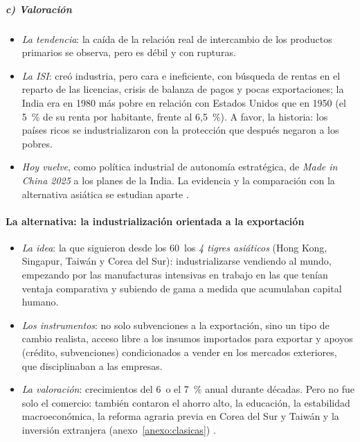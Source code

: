 \documentclass[11pt]{article}
\begin{document}
\subparagraph{c) Valoración}

\begin{itemize}
\item \emph{La tendencia}: la caída de la relación real de intercambio de los productos primarios se observa, pero es débil y con rupturas.
\item \emph{La ISI}: creó industria, pero cara e ineficiente, con búsqueda de rentas en el reparto de las licencias\nocite{Krueger1974Political}, crisis de balanza de pagos y pocas exportaciones; la India era en 1980 más pobre en relación con Estados Unidos que en 1950 (el 5~\% de su renta por habitante, frente al 6,5~\%)\nocite{BoltvanZanden2025}. A favor, la historia: los países ricos se industrializaron con la protección que después negaron a los pobres\nocite{Chang2002}.
\item \emph{Hoy vuelve}, como política industrial de autonomía estratégica, de \emph{Made in China 2025} a los planes de la India\nocite{Irwin2021}. La evidencia y la comparación con la alternativa asiática se estudian aparte .
\end{itemize}

\paragraph{La alternativa: la industrialización orientada a la exportación}

\begin{itemize}
\item \emph{La idea}: la que siguieron desde los 60~los \emph{4 tigres asiáticos} (Hong Kong, Singapur, Taiwán y Corea del Sur): industrializarse vendiendo al mundo, empezando por las manufacturas intensivas en trabajo en las que tenían ventaja comparativa y subiendo de gama a medida que acumulaban capital humano.
\item \emph{Los instrumentos}: no solo subvenciones a la exportación, sino un tipo de cambio realista, acceso libre a los insumos importados para exportar y apoyos (crédito, subvenciones) condicionados a vender en los mercados exteriores, que disciplinaban a las empresas.
\item \emph{La valoración}: crecimientos del 6~o el 7~\% anual durante décadas. Pero no fue solo el comercio: también contaron el ahorro alto, la educación, la estabilidad macroeconómica, la reforma agraria previa en Corea del Sur y Taiwán y la inversión extranjera (anexo~\ref{anexo:clasicas}) .
\end{itemize}
\end{document}
